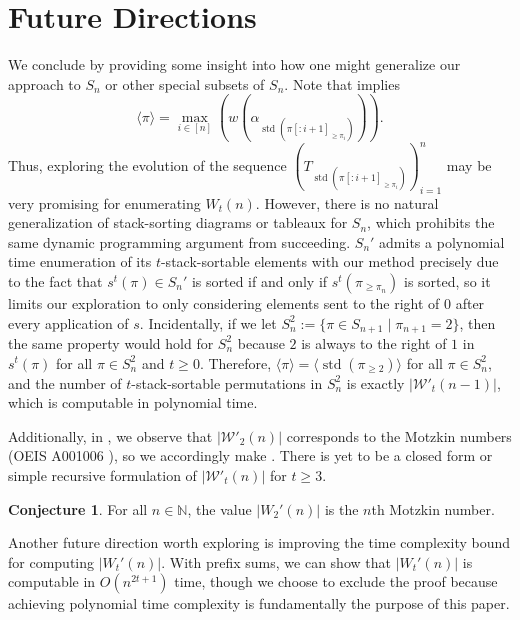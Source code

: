 \documentclass[12pt]{amsart}
\DeclareMathOperator{\std}{std}
\newcommand{\met}[1]{\langle #1\rangle}
\theoremstyle{definition}
\newtheorem{conjecture}[theorem]{Conjecture}
\begin{document}
\section{Future Directions}
We conclude by providing some insight into how one might generalize our approach to $S_n$ or other special subsets of $S_n$. Note that  implies
\[\met{\pi}=\max_{i\in [n]}\left(w\left(\alpha_{\std\left(\pi[:i+1]_{\ge\pi_i}\right)}\right)\right).\]
Thus, exploring the evolution of the sequence $\left(T_{\std\left(\pi[:i+1]_{\ge\pi_i}\right)}\right)_{i=1}^n$ may be very promising for enumerating $W_t(n)$. However, there is no natural generalization of stack-sorting diagrams or tableaux for $S_n$, which prohibits the same dynamic programming argument from succeeding. $S_n'$ admits a polynomial time enumeration of its $t$-stack-sortable elements with our method precisely due to the fact that $s^t(\pi) \in S_n'$ is sorted if and only if $s^t(\pi_{\ge {\pi_n}})$ is sorted, so it limits our exploration to only considering elements sent to the right of $0$ after every application of $s$. Incidentally, if we let $S_n^2:=\{\pi\in S_{n+1}\mid \pi_{n+1}=2\}$, then the same property would hold for $S_n^2$ because $2$ is always to the right of $1$ in $s^t(\pi)$ for all $\pi\in S_n^2$ and $t\ge 0$. Therefore, $\met{\pi}=\met{\std(\pi_{\ge2})}$ for all $\pi\in S_n^2$, and the number of $t$-stack-sortable permutations in $S_n^2$ is exactly $|\mathcal{W}'_t(n-1)|$, which is computable in polynomial time.

Additionally, in , we observe that $|\mathcal{W}'_2(n)|$ corresponds to the Motzkin numbers (OEIS A001006 \cite{oeis_A001006}), so we accordingly make . There is yet to be a closed form or simple recursive formulation of $|\mathcal{W}'_t(n)|$ for $t\ge 3$.
 
\begin{conjecture}\label{conj}
For all $n\in \mathbb{N}$, the value $|W_2'(n)|$ is the $n$th Motzkin number.
\end{conjecture}
Another future direction worth exploring is improving the time complexity bound for computing $|W_t'(n)|$. With prefix sums, we can show that $|W_t'(n)|$ is computable in $O(n^{2t+1})$ time, though we choose to exclude the proof because achieving polynomial time complexity is fundamentally the purpose of this paper.
\end{document}
